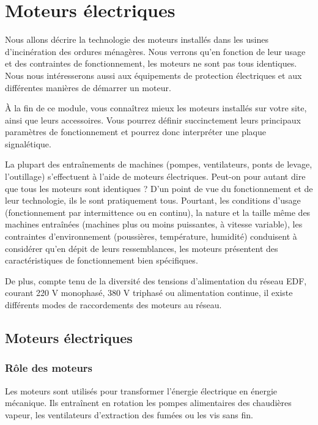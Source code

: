 \chapter{Moteurs électriques}


Nous allons décrire la technologie des moteurs installés dans les usines d’incinération des ordures ménagères. Nous verrons qu’en fonction de leur usage et des contraintes de fonctionnement, les moteurs ne sont pas tous identiques. Nous nous intéresserons aussi aux équipements de protection électriques et aux différentes manières de démarrer un moteur. 
\vspace{0.3cm}

À la fin de ce module, vous connaîtrez mieux les moteurs installés sur votre site, ainsi que leurs accessoires. Vous pourrez définir succinctement leurs principaux paramètres de fonctionnement et pourrez donc interpréter une plaque signalétique.
\vspace{0.3cm}

La plupart des entraînements de machines (pompes, ventilateurs, ponts de levage, l’outillage) s’effectuent à l’aide de moteurs électriques. Peut-on pour autant dire que tous les moteurs sont identiques ? D’un point de vue du fonctionnement et de leur technologie, ils le sont pratiquement tous. Pourtant, les conditions d’usage (fonctionnement par intermittence ou en continu), la nature et la taille même des machines entraînées (machines plus ou moins puissantes, à vitesse variable), les contraintes d’environnement (poussières, température, humidité) conduisent à considérer qu’en dépit de leurs ressemblances, les moteurs présentent des caractéristiques de fonctionnement bien spécifiques.
\vspace{0.3cm}

De plus, compte tenu de la diversité des tensions d’alimentation du réseau EDF, courant 220 V monophasé, 380 V triphasé ou alimentation continue, il existe différents modes de raccordements des moteurs au réseau.


\section{Moteurs électriques}


\subsection{Rôle des moteurs} 

Les moteurs sont utilisés pour transformer l’énergie électrique en énergie mécanique. Ils entraînent en rotation les pompes alimentaires des chaudières vapeur, les ventilateurs d’extraction des fumées ou les vis sans fin.



